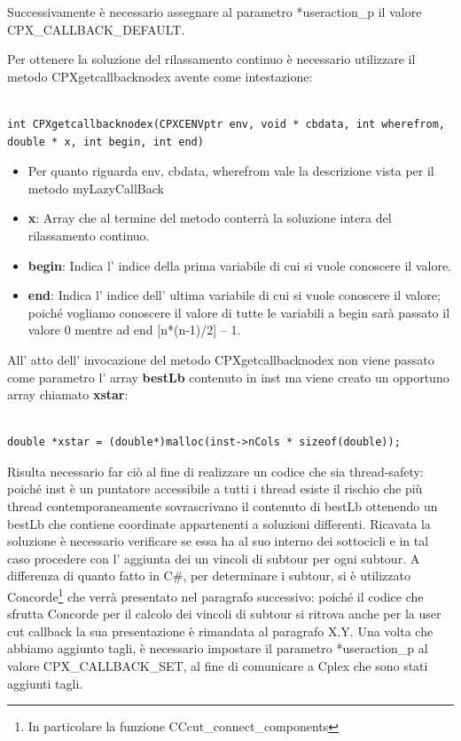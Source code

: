 \documentclass[11pt]{article}
\begin{document}
Successivamente è necessario assegnare al parametro *useraction\_p il valore CPX\_CALLBACK\_DEFAULT.


Per ottenere  la soluzione del rilassamento continuo  è necessario utilizzare il metodo CPXgetcallbacknodex avente come intestazione:

\begin{lstlisting}

int CPXgetcallbacknodex(CPXCENVptr env, void * cbdata, int wherefrom, double * x, int begin, int end) 

\end{lstlisting}


\begin{itemize}
	\item Per quanto riguarda env, cbdata, wherefrom vale la descrizione vista per il metodo myLazyCallBack
	\item \textbf{x}: Array che al termine del metodo conterrà la soluzione intera del rilassamento continuo.
	\item \textbf{begin}: Indica l’ indice della prima variabile di cui si vuole conoscere il valore.
	\item \textbf{end}: Indica l’ indice dell’ ultima variabile di cui si vuole conoscere il valore; poiché vogliamo conoscere il valore di tutte le variabili a begin sarà passato il valore 0 mentre ad end [n*(n-1)/2] – 1.
\end{itemize}

All' atto dell' invocazione del metodo CPXgetcallbacknodex non viene passato come parametro l' array \textbf{bestLb} contenuto in inst ma viene creato un opportuno array chiamato \textbf{xstar}:


\begin{lstlisting}

double *xstar = (double*)malloc(inst->nCols * sizeof(double));

\end{lstlisting}

Risulta necessario far ciò al fine di realizzare un codice che sia thread-safety: poiché inst è un puntatore accessibile a tutti i thread esiste il rischio che più thread contemporaneamente sovrascrivano il contenuto di bestLb ottenendo un bestLb che contiene coordinate appartenenti a soluzioni differenti.
Ricavata la soluzione è necessario verificare se essa ha al suo interno dei sottocicli e in tal caso procedere con l’ aggiunta dei un vincoli di subtour per ogni subtour. A differenza di quanto fatto in C\#, per determinare i subtour, si è utilizzato Concorde\footnote{ In particolare la funzione CCcut\_connect\_components } che verrà presentato nel paragrafo successivo: poiché il codice che sfrutta Concorde per il calcolo dei vincoli di subtour si ritrova anche per la user cut callback la sua presentazione è rimandata al paragrafo X.Y.
Una volta che abbiamo aggiunto tagli, è necessario impostare il parametro *useraction\_p al valore CPX\_CALLBACK\_SET, al fine di comunicare a Cplex che sono stati aggiunti tagli. 
\end{document}
